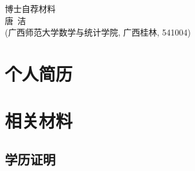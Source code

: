 \documentclass[UFT8]{ctexart}%
\begin{document}
\thispagestyle{empty} %
\vspace*{3cm}
\begin{center}
{{\LARGE\heiti 博士自荐材料}\\[0.6cm]
{\normalsize 唐\ 洁}\\[0.1cm]
{\small(广西师范大学数学与统计学院, 广西桂林, 541004)}}
\end{center}

\clearpage%
\tableofcontents%
\thispagestyle{empty} %

\clearpage%
\setcounter{page}{1}%

%
%
%
%
%
%
%
%


\section{个人简历}


\section{相关材料}


\subsection{学历证明}


%
%
%
%
%
%
\end{document}
